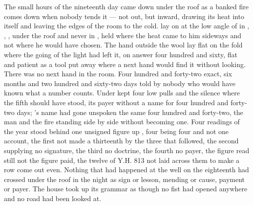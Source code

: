 
The small hours of the nineteenth day came down under the  roof as a banked fire comes down when nobody tends it --- not out, but inward, drawing its heat into itself and leaving the edges of the room to the cold.  lay on  at the low angle of  in , , , under the roof and never in , held where the heat came to him sideways and not where he would have chosen. The hand outside the wool lay flat on the fold where the going of the light had left it, on answer four hundred and sixty, flat and patient as a tool put away where a next hand would find it without looking. There was no next hand in the room. Four hundred and forty-two exact, six months and two hundred and sixty-two days told by nobody who would have known what a number counts. Under   kept four low pulls and the silence where the fifth should have stood, its payer without a name for four hundred and forty-two days; 's name had gone unspoken the same four hundred and forty-two, the man and the fire standing side by side without becoming one. Four readings of the year stood behind one unsigned figure up , four being four and not one account, the first not made a thirteenth by the three that followed, the second supplying no signature, the third no doctrine, the fourth no payer, the figure read still not the figure paid, the twelve of Y.H. 813 not laid across them to make a row come out even. Nothing that had happened at the well on the eighteenth had crossed under the roof in the night as sign or lesson, mending or cause, payment or payer. The house took up its grammar as though no fist had opened anywhere and no road had been looked at.

